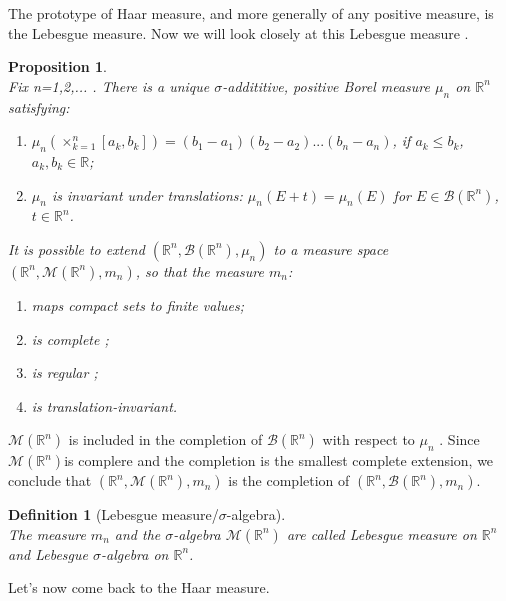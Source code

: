 \documentclass[a4paper,11pt]{article} %
\numberwithin{equation}{section} %
\numberwithin{figure}{section} %
\newtheorem{dfn}{Definition}
\newtheorem{prop}{Proposition}
\begin{document}
The prototype of Haar measure, and more generally of any positive measure, is the Lebesgue measure. Now we will look closely at this Lebesgue measure \cite[sect. 1.46, p. 27]{Moretti2012}.

\begin{prop} \cite[Prop. 1.65, p28]{Moretti2012} \\
Fix n=1,2,... . There is a unique $\sigma$-addititive, positive Borel measure $\mu_n$ on $\mathbb{R}^n$ satisfying:
\begin{enumerate}
\item $\mu_n ( \times_{k=1}^{n} [a_k,b_k] ) = (b_1 - a_1)(b_2 - a_2) ... (b_n - a_n) $, if $a_k \leq b_k$, $a_k, b_k \in \mathbb{R}$;
\item $\mu_n$ is invariant under translations: $\mu_n (E + t) = \mu_n (E)$ for $E \in \mathcal{B}(\mathbb{R}^n)$, $t \in \mathbb{R}^n$.
\end{enumerate}
It is possible to extend $(\mathbb{R}^{n},\mathcal{B}(\mathbb{R}^n),\mu_n)$ to a measure space $(\mathbb{R}^{n},\mathcal{M}(\mathbb{R}^{n}),m_n)$, so that the measure $m_n$: 
\begin{enumerate}
\item maps compact sets to finite values;
\item is complete \cite[Def. 1.46, p.21]{Moretti2012};
\item is regular \cite[Def. 1.42, (vii), p. 20]{Moretti2012};
\item is translation-invariant.
\end{enumerate}
\end{prop}

$\mathcal{M}(\mathbb{R}^{n})$ is included in the completion of $\mathcal{B}(\mathbb{R}^n)$ with respect to $\mu_n$ \cite[Prop. 1.48, p. 21]{Moretti2012}. Since $\mathcal{M}(\mathbb{R}^{n})$is complere and the completion is the smallest complete extension, we conclude that $(\mathbb{R}^{n},\mathcal{M}(\mathbb{R}^{n}),m_n)$ is the completion of  $(\mathbb{R}^{n},\mathcal{B}(\mathbb{R}^{n}),m_n)$.

\begin{dfn}[Lebesgue measure/$\sigma$-algebra] \cite[Def. A.67, p. 28]{Moretti2012} \\
The measure $m_n$ and the $\sigma$-algebra $\mathcal{M}(\mathbb{R}^{n})$ are called Lebesgue measure on $\mathbb{R}^{n}$ and Lebesgue $\sigma$-algebra on $\mathbb{R}^{n}$.
\end{dfn}

Let's now come back to the Haar measure.
\end{document}
